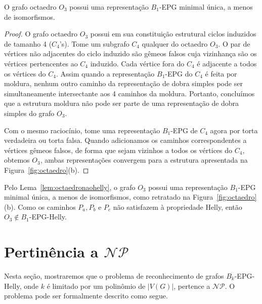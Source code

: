 \begin{lema}\label{lem:octaedronaohelly}
O grafo octaedro  $O_3$ possui uma representação $ B_1$-EPG minimal única, a menos de isomorfismos.
\end{lema}
\begin{proof}
O grafo octaedro $ O_3 $ possui em sua constituição estrutural ciclos induzidos de tamanho  4 ($ C_4$'s). 
Tome um subgrafo $ C_4 $ qualquer do octaedro $ O_3$. O par de vértices não adjacentes do ciclo induzido são gêmeos falsos cuja vizinhança são os vértices pertencentes ao $C_4$ induzido. Cada vértice fora do $C_4$ é adjacente a todos os vértices do $C_4$. Assim quando a representação $ B_1$-EPG do $C_4$ é feita por  moldura, nenhum outro caminho da representação de dobra simples pode ser simultaneamente intersectante aos 4 caminhos da moldura. Portanto, concluímos que a estrutura moldura não pode ser parte de uma representação de dobra simples do grafo $ O_3$.

Com o mesmo raciocínio, tome uma representação $ B_1$-EPG de $C_4$ agora por torta verdadeira ou torta falsa. Quando adicionamos os caminhos correspondentes a vértices gêmeos falsos, de forma que sejam vizinhos a todos os vértices do $ C_4 $, obtemos $ O_3$, ambas representações convergem para a estrutura apresentada na Figura~\ref{fig:octaedro}(b). 
 \end{proof}

 

Pelo Lema~\ref{lem:octaedronaohelly}, o grafo $ O_3 $ possui uma representação  $B_1$-EPG minimal única, a menos de isomorfismos, como retratado na Figura~\ref{fig:octaedro}(b). Como os caminhos $ P_a, P_b $ e $ P_c $  não satisfazem à propriedade Helly, então $O_3 \notin B_1$-EPG-Helly. 

\section{Pertinência a $\mathcal{NP}$}

Nesta seção, mostraremos que o problema de reconhecimento de grafos $B_k$-EPG-Helly, onde $k$ é limitado por um polinômio de $|V(G)|$, pertence a  $\mathcal{NP}$. O problema pode ser formalmente descrito como segue.



